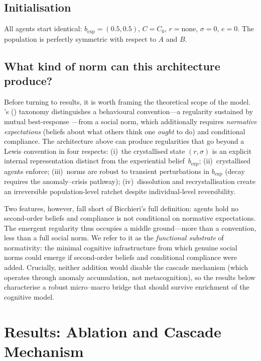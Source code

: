 \documentclass[11pt,a4paper]{article}
\begin{document}
\subsection{Initialisation}

All agents start identical: $b_{\exp} = (0.5, 0.5)$, $C = C_0$, $r = \text{none}$, $\sigma = 0$, $e = 0$. The population is perfectly symmetric with respect to $A$ and $B$.

\subsection{What kind of norm can this architecture produce?}
\label{sec:norm_status}

Before turning to results, it is worth framing the theoretical scope of the model.  \citeauthor{bicchieri2006grammar}'s (\citeyear{bicchieri2006grammar}) taxonomy distinguishes a behavioural convention---a regularity sustained by mutual best-response \citep{lewis1969convention}---from a social norm, which additionally requires \emph{normative expectations} (beliefs about what others think one \emph{ought} to do) and conditional compliance.  The architecture above can produce regularities that go beyond a Lewis convention in four respects: (i)~the crystallised state $(r, \sigma)$ is an explicit internal representation distinct from the experiential belief~$b_{\exp}$; (ii)~crystallised agents enforce; (iii)~norms are robust to transient perturbations in $b_{\exp}$ (decay requires the anomaly--crisis pathway); (iv)~dissolution and recrystallisation create an irreversible population-level ratchet despite individual-level reversibility.

Two features, however, fall short of Bicchieri's full definition: agents hold no second-order beliefs and compliance is not conditional on normative expectations.  The emergent regularity thus occupies a middle ground---more than a convention, less than a full social norm.  We refer to it as the \emph{functional substrate} of normativity: the minimal cognitive infrastructure from which genuine social norms could emerge if second-order beliefs and conditional compliance were added.  Crucially, neither addition would disable the cascade mechanism (which operates through anomaly accumulation, not metacognition), so the results below characterise a robust micro--macro bridge that should survive enrichment of the cognitive model.

\section{Results: Ablation and Cascade Mechanism}
\label{sec:results}
\label{sec:ablation}
\end{document}
